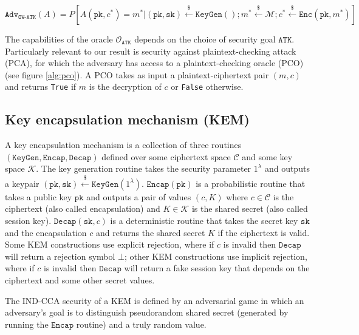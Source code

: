 \documentclass[floatrow,journal=tches,submission]{iacrtrans}
\newcommand{\keygen}{\texttt{KeyGen}}
\newcommand{\encrypt}{\texttt{Enc}}
\newcommand{\encap}{\texttt{Encap}}
\newcommand{\decap}{\texttt{Decap}}
\newcommand{\pk}{\texttt{pk}}
\newcommand{\sk}{\texttt{sk}}
\newcommand{\leftsample}{\stackrel{\$}{\leftarrow}}
\newcommand{\adv}{\texttt{Adv}}
\begin{document}
\begin{equation*}
    \adv_\texttt{OW-ATK}(A) = P\left[
        A(\pk, c^\ast) = m^\ast \vert
        (\pk, \sk) \leftsample \keygen() ;
        m^\ast \leftsample \mathcal{M};
        c^\ast \leftsample \encrypt(\pk, m^\ast)
    \right]
\end{equation*}

The capabilities of the oracle $\mathcal{O}_\texttt{ATK}$ depends on the choice of security goal $\texttt{ATK}$. Particularly relevant to our result is security against plaintext-checking attack (PCA), for which the adversary has access to a plaintext-checking oracle (PCO) (see figure \ref{alg:pco}). A PCO takes as input a plaintext-ciphertext pair $(m, c)$ and returns \texttt{True} if $m$ is the decryption of $c$ or \texttt{False} otherwise.

\subsection{Key encapsulation mechanism (KEM)}
A key encapsulation mechanism is a collection of three routines $(\keygen, \encap, \decap)$ defined over some ciphertext space $\mathcal{C}$ and some key space $\mathcal{K}$. The key generation routine takes the security parameter $1^\lambda$ and outputs a keypair $(\pk, \sk) \leftsample \keygen(1^\lambda)$. $\encap(\pk)$ is a probabilistic routine that takes a public key $\pk$ and outputs a pair of values $(c, K)$ where $c \in \mathcal{C}$ is the ciphertext (also called encapsulation) and $K \in \mathcal{K}$ is the shared secret (also called session key). $\decap(\sk, c)$ is a deterministic routine that takes the secret key $\sk$ and the encapsulation $c$ and returns the shared secret $K$ if the ciphertext is valid. Some KEM constructions use explicit rejection, where if $c$ is invalid then $\decap$ will return a rejection symbol $\bot$; other KEM constructions use implicit rejection, where if $c$ is invalid then $\decap$ will return a fake session key that depends on the ciphertext and some other secret values.

The IND-CCA security of a KEM is defined by an adversarial game in which an adversary's goal is to distinguish pseudorandom shared secret (generated by running the $\encap$ routine) and a truly random value.
\end{document}
